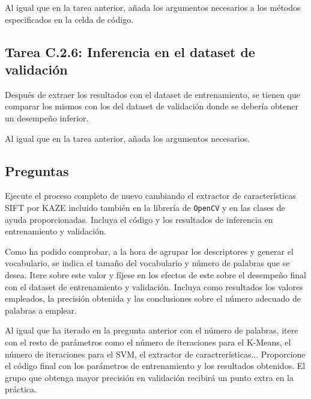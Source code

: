 Al igual que en la tarea anterior, añada los argumentos necesarios a los métodos especificados en la celda de código.

\subsection*{Tarea C.2.6: Inferencia en el dataset de validación}

Después de extraer los resultados con el dataset de entrenamiento, se tienen que comparar los mismos con los del dataset de validación donde se debería obtener un desempeño inferior.

Al igual que en la tarea anterior, añada los argumentos necesarios.


\subsection*{Preguntas}

\vspace{5mm}
\begin{tcolorbox}[colback=gray!10, colframe=gray!30, coltitle=black, title=Pregunta C.2.A: Cambio de SIFT por KAZE, halign=left]
Ejecute el proceso completo de nuevo cambiando el extractor de características SIFT por KAZE incluido también en la librería de \texttt{OpenCV} y en las clases de ayuda proporcionadas. Incluya el código y los resultados de inferencia en entrenamiento y validación.
\end{tcolorbox}

\vspace{5mm}
\begin{tcolorbox}[colback=gray!10, colframe=gray!30, coltitle=black, title=Pregunta C.2.B: ¿Cuantas palabras uso?, halign=left]
Como ha podido comprobar, a la hora de agrupar los descriptores y generar el vocabulario, se indica el tamaño del vocabulario y número de palabras que se desea. Itere sobre este valor y fíjese en los efectos de este sobre el desempeño final con el dataset de entrenamiento y validación. Incluya como resultados los valores empleados, la precisión obtenida y las conclusiones sobre el número adecuado de palabras a emplear.
\end{tcolorbox}
\vspace{5mm}

\begin{tcolorbox}[colback=gray!10, colframe=gray!30, coltitle=black, title=\textbf{EXTRA} - Pregunta C.2.C: En busca de los mejores parámetros, halign=left]
Al igual que ha iterado en la pregunta anterior con el número de palabras, itere con el resto de parámetros como el número de iteraciones para el K-Means, el número de iteraciones para el SVM, el extractor de caractrerísticas... Proporcione el código final con los parámetros de entrenamiento y los resultados obtenidos. El grupo que obtenga mayor precisión en validación recibirá un punto extra en la práctica.
\end{tcolorbox}
